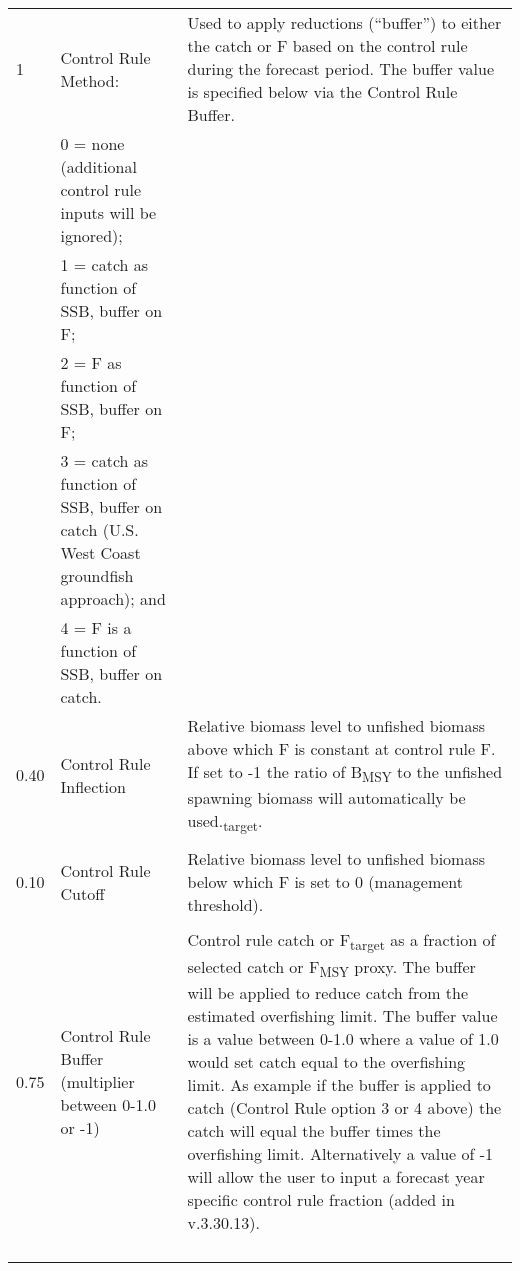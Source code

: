 \begin{landscape}
{\begin{longtable}{p{2cm} p{7cm} p{12cm}}
  \hline
  1 & Control Rule Method: & \multirow{1}{1cm}[-0.15cm]{\parbox{12cm}{Used to apply reductions (``buffer'') to either the catch or F based on the control rule during the forecast period. The buffer value is specified below via the Control Rule Buffer.}} \Tstrut\\
    & 0 = none (additional control rule inputs will be ignored); & \\
    & 1 = catch as function of SSB, buffer on F; & \\
    & 2 = F as function of SSB, buffer on F; & \\
    & 3 = catch as function of SSB, buffer on catch (U.S. West Coast groundfish approach); and & \\
    & 4 = F is a function of SSB, buffer on catch. & \Bstrut\\
  \hline

  0.40 \Tstrut & Control Rule Inflection & \multirow{1}{1cm}[-0.2cm]{\parbox{12cm}{Relative biomass level to unfished biomass above which F is constant at control rule F. If set to -1 the ratio of B\textsubscript{MSY} to the unfished spawning biomass will automatically be used.\textsubscript{target}.}} \Bstrut\\
    & & \Tstrut\Bstrut\\

  \hline
  0.10 \Tstrut & Control Rule Cutoff & \multirow{1}{1cm}[-0.2cm]{\parbox{12cm}{Relative biomass level to unfished biomass below which F is set to 0 (management threshold).}} \\
    & & \\

  \hline
  0.75 \Tstrut & Control Rule Buffer (multiplier between 0-1.0 or -1) & \multirow{1}{1cm}[-0.25cm]{\parbox{12cm}{Control rule catch or F\textsubscript{target} as a fraction of selected catch or F\textsubscript{MSY} proxy. The buffer will be applied to reduce catch from the estimated overfishing limit. The buffer value is a value between 0-1.0 where a value of 1.0 would set catch equal to the overfishing limit. As example if the buffer is applied to catch (Control Rule option 3 or 4 above) the catch will equal the buffer times the overfishing limit. Alternatively a value of -1 will allow the user to input a forecast year specific control rule fraction (added in v.3.30.13).}} \Bstrut\\ 
    & & \Bstrut\\
    & & \Bstrut\\
    & & \Bstrut\\
    & & \Bstrut\\


\end{longtable}}
\end{landscape}

